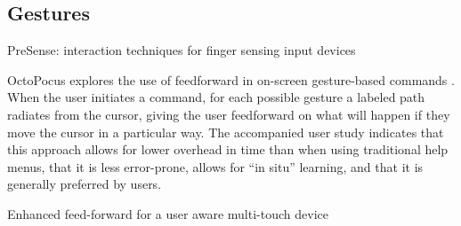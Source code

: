 \documentclass[a4paper]{article}
\begin{document}
\subsection{Gestures} \label{subsection_gestures}
PreSense: interaction techniques for finger sensing input devices \cite{rekimoto2003presense}

OctoPocus explores the use of feedforward in on-screen gesture-based commands \cite{bau2008octopocus}. When the user initiates a command, for each possible gesture a labeled path radiates from the cursor, giving the user feedforward on what will happen if they move the cursor in a particular way. The accompanied user study indicates that this approach allows for lower overhead in time than when using traditional help menus, that it is less error-prone, allows for ``in situ'' learning, and that it is generally preferred by users.

Enhanced feed-forward for a user aware multi-touch device \cite{freitag2012enhanced}
\end{document}

